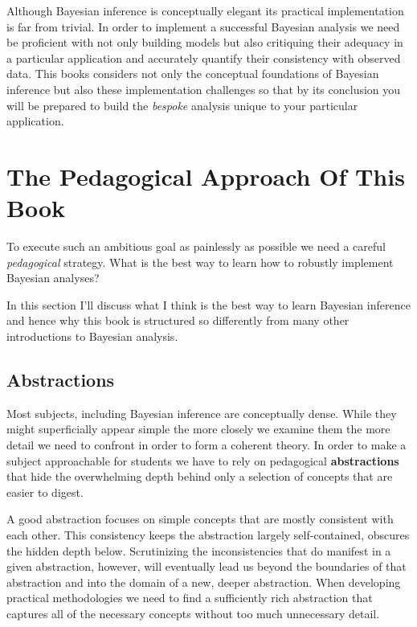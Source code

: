 \documentclass[
  letterpaper,
  DIV=11,
  numbers=noendperiod]{scrartcl}
\begin{document}
Although Bayesian inference is conceptually elegant its practical
implementation is far from trivial. In order to implement a successful
Bayesian analysis we need be proficient with not only building models
but also critiquing their adequacy in a particular application and
accurately quantify their consistency with observed data. This books
considers not only the conceptual foundations of Bayesian inference but
also these implementation challenges so that by its conclusion you will
be prepared to build the \emph{bespoke} analysis unique to your
particular application.

\hypertarget{the-pedagogical-approach-of-this-book}{%
\section{The Pedagogical Approach Of This
Book}\label{the-pedagogical-approach-of-this-book}}

To execute such an ambitious goal as painlessly as possible we need a
careful \emph{pedagogical} strategy. What is the best way to learn how
to robustly implement Bayesian analyses?

In this section I'll discuss what I think is the best way to learn
Bayesian inference and hence why this book is structured so differently
from many other introductions to Bayesian analysis.

\hypertarget{abstractions}{%
\subsection{Abstractions}\label{abstractions}}

Most subjects, including Bayesian inference are conceptually dense.
While they might superficially appear simple the more closely we examine
them the more detail we need to confront in order to form a coherent
theory. In order to make a subject approachable for students we have to
rely on pedagogical \textbf{abstractions} that hide the overwhelming
depth behind only a selection of concepts that are easier to digest.

A good abstraction focuses on simple concepts that are mostly consistent
with each other. This consistency keeps the abstraction largely
self-contained, obscures the hidden depth below. Scrutinizing the
inconsistencies that do manifest in a given abstraction, however, will
eventually lead us beyond the boundaries of that abstraction and into
the domain of a new, deeper abstraction. When developing practical
methodologies we need to find a sufficiently rich abstraction that
captures all of the necessary concepts without too much unnecessary
detail.
\end{document}
